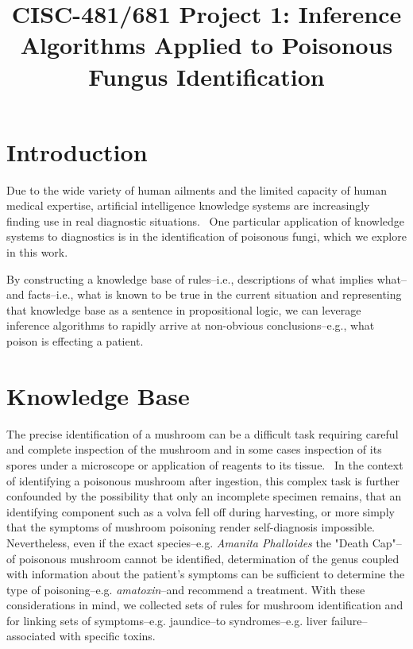 \documentclass[12pt, conference, compsocconf]{IEEEtran}
\begin{document}
\title{CISC-481/681 Project 1: Inference Algorithms Applied to Poisonous Fungus Identification}

\author{ }

\maketitle

\section{Introduction}
Due to the wide variety of human ailments and the limited capacity of human medical expertise, artificial intelligence knowledge systems are increasingly finding use in real diagnostic situations.~\cite{expert-systems-in-diagnosis}
One particular application of knowledge systems to diagnostics is in the identification of poisonous fungi, which we explore in this work. 

By constructing a knowledge base of rules--i.e., descriptions of what implies what--and facts--i.e., what is known to be true in the current situation and representing that knowledge base as a sentence in propositional logic, we can leverage inference algorithms to rapidly arrive at non-obvious conclusions--e.g., what poison is effecting a patient. 

\section{Knowledge Base}
The precise identification of a mushroom can be a difficult task requiring careful and complete inspection of the mushroom and in some cases inspection of its spores under a microscope or application of reagents to its tissue.~\cite{handbook-mushroom-poison}
In the context of identifying a poisonous mushroom after ingestion, this complex task is further confounded by the possibility that only an incomplete specimen remains, that an identifying component such as a volva fell off during harvesting, or more simply that the symptoms of mushroom poisoning render self-diagnosis impossible. 
Nevertheless, even if the exact species--e.g. \emph{Amanita Phalloides} the "Death Cap"--of poisonous mushroom cannot be identified, determination of the genus coupled with information about the patient's symptoms can be sufficient to determine the type of poisoning--e.g. \emph{amatoxin}--and recommend a treatment. 
With these considerations in mind, we collected sets of rules for mushroom identification and for linking sets of symptoms--e.g. jaundice--to syndromes--e.g. liver failure--associated with specific toxins. 
\end{document}
